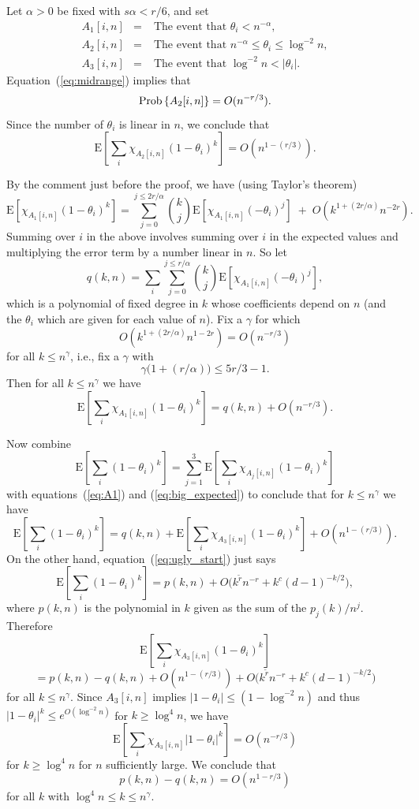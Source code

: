\documentclass[12pt]{article}
\newcommand{\E}[1]{\mbox{E}\left[#1\right] }
\newcommand{\prob}[1]{{\rm Prob}\left\{ #1 \right\} }
\begin{document}
Let $\alpha>0$ be fixed with $s\alpha<r/6$, and set
\begin{eqnarray*}
A_1[i,n] &=& \;\mbox{The event that $\theta_i<n^{-\alpha}$},\\
A_2[i,n] &=& \;\mbox{The event that $n^{-\alpha}\le \theta_i\le\log^{-2}n$},\\
A_3[i,n] &=& \;\mbox{The event that $\log^{-2}n<|\theta_i|$}.
\end{eqnarray*}
Equation~(\ref{eq:midrange})
implies that
$$
\prob{ A_2[i,n]} = O(n^{-r/3}).
$$
Since the number of
$\theta_i$ is linear in $n$, we conclude that
\begin{equation}\label{eq:big_expected}
\E{ \sum_i \chi_{A_2[i,n]} (1-\theta_i)^k } = O(n^{1-(r/3)}).
\end{equation}

By the comment just before the proof, we have (using Taylor's theorem)
$$
\E{ \chi_{A_1[i,n]} (1-\theta_i)^k } = 
\sum_{j=0}^{j\le 2r/\alpha} \binom{k}{j} \E{ \chi_{A_1[i,n]}(-\theta_i)^j}
\;+\;O(k^{1+(2r/\alpha)}n^{-2r}).
$$
Summing over $i$ in the above involves summing over $i$ in the expected
values and multiplying the error term by a number linear in $n$.
So let
$$
q(k,n) = \sum_i\sum_{j=0}^{j\le r/\alpha} \binom{k}{j} 
\E{ \chi_{A_1[i,n]}(-\theta_i)^j},
$$
which is a polynomial of fixed degree in $k$ whose coefficients depend on
$n$ (and the $\theta_i$ which are given for each value of $n$).
Fix a $\gamma$ for which
$$
O(k^{1+(2r/\alpha)}n^{1-2r}) = O(n^{-r/3})
$$
for all $k\le n^\gamma$, i.e., fix a $\gamma$ with
$$
\gamma\bigl( 1 + (r/\alpha) \bigr) \le 5r/3-1.
$$
Then for all $k\le n^\gamma$ we have
\begin{equation}\label{eq:A1}
\E{ \sum_i \chi_{A_1[i,n]} (1-\theta_i)^k } = q(k,n) + O(n^{-r/3}).
\end{equation}

Now combine
$$
\E{ \sum_i (1-\theta_i)^k } = \sum_{j=1}^3 \E{ \sum_i \chi_{A_j[i,n]}
(1-\theta_i)^k }
$$
with equations~(\ref{eq:A1}) and (\ref{eq:big_expected}) to conclude
that for $k\le n^\gamma$ we have
$$
\E{ \sum_i (1-\theta_i)^k } = q(k,n) + \E{ \sum_i \chi_{A_3[i,n]}
(1-\theta_i)^k } + O(n^{1-(r/3)}).
$$
On the other hand, equation~(\ref{eq:ugly_start}) just says
$$
\E{ \sum_i (1-\theta_i)^k } = p(k,n) +
O\bigl(k^{\widetilde r}n^{-r} + k^c (d-1)^{-k/2}\bigr),
$$
where $p(k,n)$ is the polynomial in $k$ given as the sum of the $p_j(k)/n^j$.
Therefore
$$
\E{ \sum_i \chi_{A_3[i,n]}(1-\theta_i)^k } 
$$
\begin{equation}\label{eq:A_three_sum}
= p(k,n) -q(k,n)+
O(n^{1-(r/3)}) + O\bigl(k^{\widetilde r}n^{-r} + k^c (d-1)^{-k/2}\bigr)
\end{equation}
for all $k\le n^\gamma$.
Since $A_3[i,n]$ implies $|1-\theta_i|\le (1-\log^{-2}n)$ and thus
$|1-\theta_i|^k\le e^{O(\log^{-2}n)}$ for $k\ge \log^4n$, we have
\begin{equation}\label{eq:for_the_end}
\E{ \sum_i \chi_{A_3[i,n]}
|1-\theta_i|^k }  = O(n^{-r/3})
\end{equation}
for $k\ge\log^4n$ for $n$ sufficiently large.  We conclude that
\begin{equation}\label{eq:pq_close}
p(k,n)-q(k,n) = O(n^{1-r/3})
\end{equation}
for all $k$ with $\log^4 n\le k\le n^\gamma$.
\end{document}
